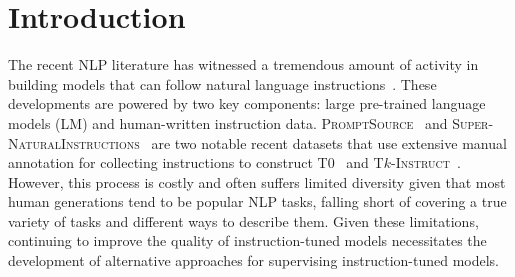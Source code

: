 \documentclass[11pt]{article}
\newcommand{\yizhong}[1]{\textcolor{violet}{[YZ: #1]}}
\newcommand{\swaroop}[1]{\textcolor{cyan}{[SM: #1]}}
\newcommand{\daniel}[1]{\textcolor{blue}{[DK: #1]}}
\newcommand{\nascomment}[1]{\textcolor{blue}{\textbf{[#1 -- \textsc{nas}]}}}
\newcommand{\alisa}[1]{\textcolor{purple}{\textbf{[#1 -- \textsc{al}]}}}
\newcommand{\name}{\textsc{Self-Instruct}}
\newcommand{\supernat}{\textsc{Super-NaturalInstructions}}
\newcommand{\tkinstruct}{\textsc{T$k$-Instruct}}
\newcommand{\tzero}{\textsc{T$0$}}
\newcommand{\promptsource}{\textsc{PromptSource}}
\begin{document}
\section{Introduction}
\label{sec:intro}
The recent  NLP literature has witnessed a tremendous amount of activity in building models that can follow natural language instructions~\citep[i.a.]{mishra2022cross,wei2022finetuned,sanh2022multitask,wang2022benchmarking,ouyang2022training,chung2022scaling}.
These developments are powered by two key components: large pre-trained language models (LM) and human-written instruction data.
\promptsource{}~\citep{bach2022promptsource} and \supernat{}~\citep{wang2022benchmarking} are two notable recent datasets that use extensive manual annotation for collecting instructions to construct \tzero~\cite{bach2022promptsource,sanh2022multitask} and \tkinstruct~\cite{wang2022benchmarking}. 
However, this process is costly and often suffers limited diversity given that most human generations tend to be popular NLP tasks, falling short of covering a true variety of tasks and different ways to describe them. 
Given these limitations, continuing to improve the quality of instruction-tuned  models 
necessitates the development of alternative approaches for supervising instruction-tuned models. 



\end{document}
